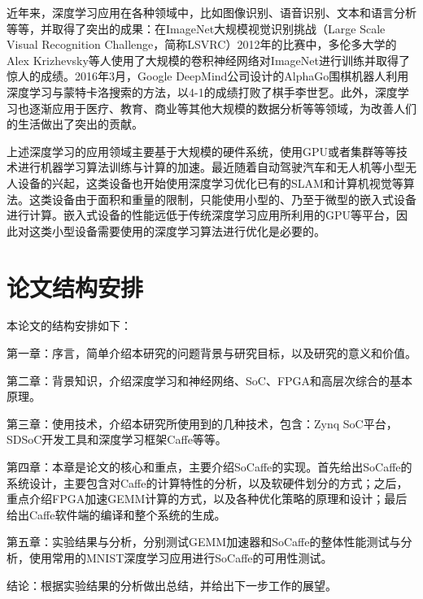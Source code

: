 
近年来，深度学习应用在各种领域中，比如图像识别、语音识别、文本和语言分析等等，并取得了突出的成果：在ImageNet大规模视觉识别挑战（Large Scale Visual Recognition Challenge，简称LSVRC）2012年的比赛中，多伦多大学的Alex Krizhevsky\supercite{krizhevsky2012imagenet}等人使用了大规模的卷积神经网络对ImageNet进行训练并取得了惊人的成绩。2016年3月，Google DeepMind公司设计的AlphaGo围棋机器人\supercite{silver2016mastering}利用深度学习与蒙特卡洛搜索的方法，以4-1的成绩打败了棋手李世乭。此外，深度学习也逐渐应用于医疗、教育、商业等其他大规模的数据分析等等领域，为改善人们的生活做出了突出的贡献。

上述深度学习的应用领域主要基于大规模的硬件系统，使用GPU或者集群等等技术进行机器学习算法训练与计算的加速。最近随着自动驾驶汽车和无人机等小型无人设备的兴起，这类设备也开始使用深度学习优化已有的SLAM和计算机视觉等算法。这类设备由于面积和重量的限制，只能使用小型的、乃至于微型的嵌入式设备进行计算。嵌入式设备的性能远低于传统深度学习应用所利用的GPU等平台，因此对这类小型设备需要使用的深度学习算法进行优化是必要的。

\section{论文结构安排}

本论文的结构安排如下：

第一章：序言，简单介绍本研究的问题背景与研究目标，以及研究的意义和价值。

第二章：背景知识，介绍深度学习和神经网络、SoC、FPGA和高层次综合的基本原理。

第三章：使用技术，介绍本研究所使用到的几种技术，包含：Zynq SoC平台，SDSoC开发工具和深度学习框架Caffe等等。

第四章：本章是论文的核心和重点，主要介绍SoCaffe的实现。首先给出SoCaffe的系统设计，主要包含对Caffe的计算特性的分析，以及软硬件划分的方式；之后，重点介绍FPGA加速GEMM计算的方式，以及各种优化策略的原理和设计；最后给出Caffe软件端的编译和整个系统的生成。

第五章：实验结果与分析，分别测试GEMM加速器和SoCaffe的整体性能测试与分析，使用常用的MNIST深度学习应用进行SoCaffe的可用性测试。

结论：根据实验结果的分析做出总结，并给出下一步工作的展望。


